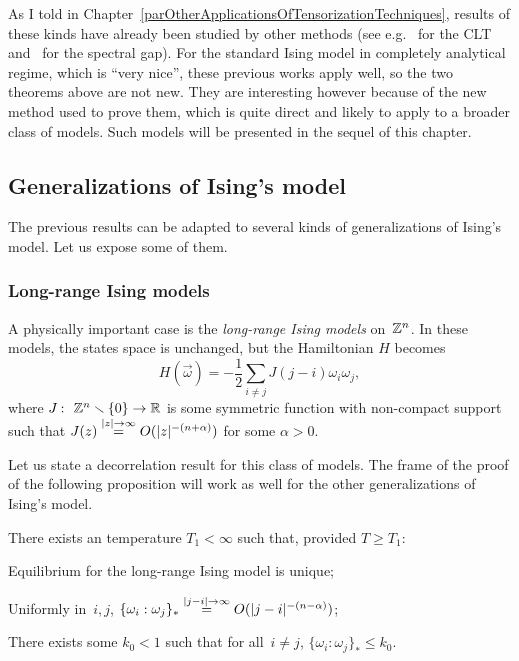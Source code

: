 \begin{Rmk}
As I told in Chapter~\ref{parOtherApplicationsOfTensorizationTechniques},
results of these kinds have already been studied by other methods
(see e.g.~\cite{Bradley92, Dedecker} for the CLT and~\cite{Martinelli} for the spectral gap).
For the standard Ising model in completely analytical regime,
which is ``very nice'', these previous works apply well,
so the two theorems above are not new.
They are interesting however because of the new method used to prove them,
which is quite direct and likely to apply to a broader class of models.
Such models will be presented in the sequel of this chapter.
\end{Rmk}


\subsection{Generalizations of Ising's model}

The previous results can be adapted to several kinds of generalizations of Ising's model.
Let us expose some of them.

\subsubsection*{Long-range Ising models}

A physically important case is the \emph{long-range Ising models} on~$\mathbb{Z}^n$.
In these models, the states space is unchanged, but the Hamiltonian $H$ becomes
\[ H(\vec\omega) = - \frac{1}{2} \sum_{i\neq j} J(j-i) \omega_i\omega_j ,\]
where $J \colon \ZZ^n\setminus\{0\} \to \RR$ is some symmetric function with non-compact support
such that $J(z) \stackrel{|z|\to\infty}{=} O(|z|^{-(n+\alpha)})$ for some $\alpha>0$.

Let us state a decorrelation result for this class of models.
The frame of the proof of the following proposition will work as well
for the other generalizations of Ising's model.
%
\begin{Pro}\label{pro5088}
There exists an temperature $T_1 < \infty$ such that, provided $T\geq T_1$:
\begin{ienumerate}
\item\label{i0797} Equilibrium for the long-range Ising model is unique;
\item\label{i96a} Uniformly in~$i,j$,
$\{\omega_i:\omega_j\}_* \stackrel{|j-i|\to\infty}{=} O(|j-i|^{-(n-\alpha)})$;
\item\label{i96b} There exists some $k_0 < 1$ such that for all~$i\neq j$,
$\{\omega_i:\omega_j\}_* \leq k_0$.
\end{ienumerate}
\end{Pro}

